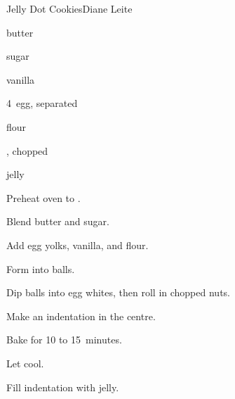\begin{recipe}{Jelly Dot Cookies}{Diane Leite}{}

\begin{ingredients}
\item {} butter
\item {} sugar
\item {} vanilla
\item 4~egg, separated
\item {} flour
\item {}, chopped
\item jelly
\end{ingredients}

\begin{directions}
\item Preheat oven to .
\item Blend butter and sugar.
\item Add egg yolks, vanilla, and flour.
\item Form into balls.
\item Dip balls into egg whites, then roll in chopped nuts.
\item Make an indentation in the centre.
\item Bake for 10 to 15~minutes.
\item Let cool.
\item Fill indentation with jelly.
\end{directions}

\hint{}
\end{recipe}
